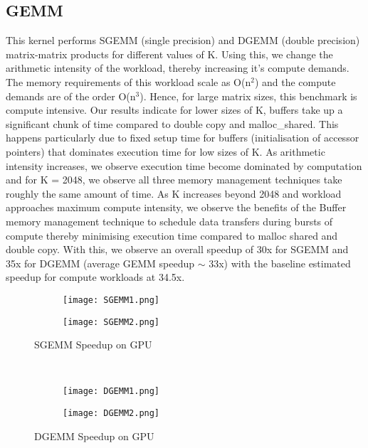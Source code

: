 \documentclass[14pt,fleqn]{article}
\begin{document}
\subsection{GEMM}
This kernel performs SGEMM (single precision) and DGEMM (double precision) matrix-matrix products for different values of K. Using this, we change the arithmetic intensity of the workload, thereby increasing it's compute demands. The memory requirements of this workload scale as O(n$^2$) and the compute demands are of the order O(n$^3$). Hence, for large matrix sizes, this benchmark is compute intensive. Our results indicate for lower sizes of K, buffers take up a significant chunk of time compared to double copy and malloc\_shared. This happens particularly due to fixed setup time for buffers (initialisation of accessor pointers) that dominates execution time for low sizes of K. As arithmetic intensity increases, we observe execution time become dominated by computation and for K = 2048, we observe all three memory management techniques take roughly the same amount of time. As K increases beyond 2048 and workload approaches maximum compute intensity, we observe the benefits of the Buffer memory management technique to schedule data transfers during bursts of compute thereby minimising execution time compared to malloc shared and double copy. With this, we observe an overall speedup of 30x for SGEMM and 35x for DGEMM (average GEMM speedup $\sim$ 33x) with the baseline estimated speedup for compute workloads at 34.5x. \\
\begin{figure}
\begin{subfigure}{.5\textwidth}
    \texttt{[image: SGEMM1.png]}
\end{subfigure}%
\begin{subfigure}{.5\textwidth}
    \texttt{[image: SGEMM2.png]}
\end{subfigure}%
    \caption{SGEMM Speedup on GPU}
\end{figure}
\\
\begin{figure}
\begin{subfigure}{.5\textwidth}
    \texttt{[image: DGEMM1.png]}
\end{subfigure}%
\begin{subfigure}{.5\textwidth}
    \texttt{[image: DGEMM2.png]}
\end{subfigure}%
    \caption{DGEMM Speedup on GPU}
\end{figure}
\end{document}
